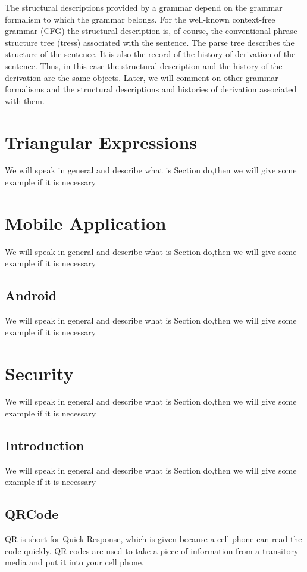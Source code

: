 The structural descriptions provided by a grammar depend on the grammar formalism to which the grammar belongs. For the well-known context-free grammar (CFG) the structural description is, of course, the conventional phrase structure tree (tress) associated with the sentence. The parse tree describes the structure of the sentence. It is also the record of the history of derivation of the sentence. Thus, in this case the structural description and the history of the derivation are the same objects. Later, we will comment on other grammar formalisms and the structural descriptions and histories of derivation associated with them. 





\section{Triangular Expressions}
We will speak in general and describe what is Section do,then we will give some example if it is necessary

\section{Mobile Application}
We will speak in general and describe what is Section do,then we will give some example if it is necessary

\subsection{Android}
We will speak in general and describe what is Section do,then we will give some example if it is necessary



\section{Security}
We will speak in general and describe what is Section do,then we will give some example if it is necessary

\subsection{Introduction}
We will speak in general and describe what is Section do,then we will give some example if it is necessary

\subsection{QRCode}
QR is short for Quick Response, which is given because
a cell phone can read the code quickly. QR codes are used
to take a piece of information from a transitory media and
put it into your cell phone.

